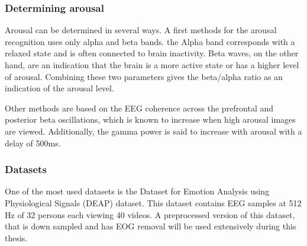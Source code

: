 \subsubsection{Determining arousal}
\label{DetArousal}

Arousal can be determined in several ways. A first methods for the arousal recognition uses only alpha and beta bands. the Alpha band corresponds with a relaxed state and is often connected to brain inactivity\cite{ExtendedPaper,RealTimeEEGEmotion}. Beta waves, on the other hand, are an indication that the brain is a more active state or has a higher level of arousal. Combining these two parameters gives the beta/alpha ratio as an indication of the arousal level. 

\npar

Other methods are based on the EEG coherence across the prefrontal and posterior beta oscillations, which is known to increase when high arousal images are viewed. Additionally, the gamma power is said to increase with arousal with a delay of 500ms\cite{GivenPaper}.

\subsubsection{Datasets}
One of the most used datasets is the Dataset for Emotion Analysis using Physiological Signals (DEAP) dataset\cite{DEAP}. This dataset contains EEG samples at 512 Hz of 32 persons each viewing 40 videos. A preprocessed version of this dataset, that is down sampled and has EOG removal will be used extensively during this thesis.

\clearpage

